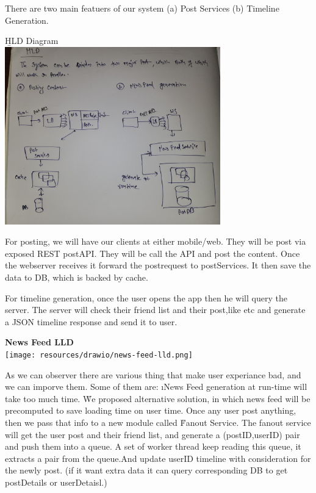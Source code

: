 There are two main featuers of our system (a) Post Services (b) Timeline Generation.

    \b{HLD Diagram}\\
    \includegraphics[width=0.7\textwidth]{resources/news-feed-hld.jpg}    



For posting, we will have our clients at either mobile/web. They will be post via exposed REST postAPI. They will be call the API and post the content. Once the webserver receives it forward the postrequest to postServices. It then save the data to DB, which is backed by cache.

For timeline generation, once the user opens the app then he will query the server. The server will check their friend list and their post,like etc and generate a JSON timeline response and send it to user.



\textbf{News Feed LLD}\\
\texttt{[image: resources/drawio/news-feed-lld.png]}

As we can observer there are various thing that make user experiance bad, and we can imporve them. Some of them are:
\lstart
    \i News Feed generation at run-time will take too much time. 
    \r We proposed alternative solution, in which news feed will be precomputed to save loading time on user time. Once any user post anything, then we pass that info to a new module called \u{Fanout Service}. The fanout service will get the user post and their friend list, and generate a (postID,userID) pair and push them into a queue. A set of worker thread keep reading this queue, it extracts a pair from the queue.And update userID timeline with consideration for the newly post. (if it want extra data it can query corresponding DB to get postDetails or userDetaisl.)

